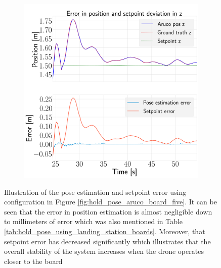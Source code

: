 \documentclass[../Head/report.tex]{subfiles}
\begin{document}
\begin{figure}[H]
\begin{subfigure}[t]{.30\textwidth}
        \caption{}
        \label{fig:hold_pose_estimation_test5_y}
    \end{subfigure}
     \hspace{0.2em}
    \begin{subfigure}[t]{.30\textwidth}
        \centering
        \includegraphics[width=\textwidth]{../Figures/hold_pose_using_aruco_pose_estimation/test5_landingBoard3_noWind/error_z/pose_error_z_test1.png}
        \caption{}
        \label{fig:hold_pose_estimation_test5_z}
    \end{subfigure}
    \caption{Illustration of the pose estimation and setpoint error using configuration in Figure \ref{fig:hold_pose_aruco_board_five}. It can be seen that the error in position estimation is almost negligible down to millimeters of error which was also mentioned in Table \ref{tab:hold_pose_using_landing_station_boards}. Moreover, that setpoint error has decreased significantly which illustrates that the overall stability of the system increases when the drone operates closer to the board}
    \label{fig:hold_pose_estimation_test5_error_pos}
\end{figure}
\end{document}
